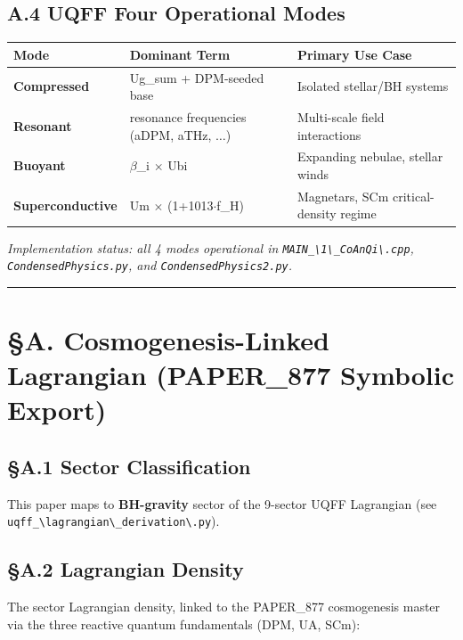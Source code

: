 \documentclass[12pt,a4paper]{article}
\begin{document}
\subsection{A.4 UQFF Four Operational Modes}

\begin{table}[H]
\centering
\small
\begin{tabularx}{\linewidth}{@{}>{\raggedright\arraybackslash}X>{\raggedright\arraybackslash}X>{\raggedright\arraybackslash}X@{}}
\toprule
Mode & Dominant Term & Primary Use Case \tabularnewline
\midrule
\textbf{Compressed} & Ug\_sum + DPM-seeded base & Isolated stellar/BH systems \tabularnewline
\textbf{Resonant} & 5 resonance frequencies (aDPM, aTHz, $\ldots${}) & Multi-scale field interactions \tabularnewline
\textbf{Buoyant} & $\beta$\_i $\times$ Ubi & Expanding nebulae, stellar winds \tabularnewline
\textbf{Superconductive} & Um $\times$ (1+1013$\cdot$f\_H) & Magnetars, SCm critical-density regime \tabularnewline
\bottomrule
\end{tabularx}
\end{table}

\emph{Implementation status: all 4 modes operational in \texttt{MAIN\_\textbackslash {1\textbackslash \_CoAnQi\textbackslash }.cpp}, \texttt{CondensedPhysics.py}, and \texttt{CondensedPhysics2.py}.}

\medskip\hrule\medskip

\section{\S{}A. Cosmogenesis-Linked Lagrangian (PAPER\_877 Symbolic Export)}

\subsection{\S{}A.1 Sector Classification}

This paper maps to \textbf{BH-gravity} sector of the 9-sector UQFF Lagrangian (see \texttt{uqff\_\textbackslash {lagrangian\textbackslash \_derivation\textbackslash }.py}).

\subsection{\S{}A.2 Lagrangian Density}

The sector Lagrangian density, linked to the PAPER\_877 cosmogenesis master via the three reactive quantum fundamentals (DPM, UA, SCm):
\end{document}
